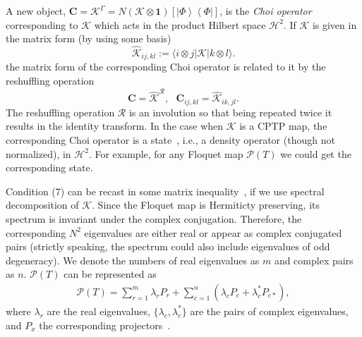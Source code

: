 \documentclass[%
 aip,
 floatfix,
 amsmath,amssymb,
 reprint,%
]{revtex4-1}
\newcommand{\id}{\mathbf{1}}
\newcommand{\ket}[1]{{\left|  #1 \right\rangle}}
\newcommand{\bra}[1]{{\left\langle  #1 \right|}}
\begin{document}
A new object, $\mathbf{C} = \mathcal{K}^\Gamma = N (\mathcal{K} \otimes \id)[\ket{\Phi}\bra{\Phi}]$, is the \emph{Choi operator}~\cite{choi} corresponding to $\mathcal{K}$ which acts in the product Hilbert space $\mathcal{H}^2$. If $\mathcal{K}$ is given in the matrix form (by using some basis)
\begin{equation}\label{super2}
   \widehat{\mathcal{K}}_{ij,kl} := \langle i \otimes j|  \mathcal{K} | k \otimes l\rangle .
\end{equation}
the matrix form of the corresponding Choi operator is related to it by the reshuffling operation~\cite{duala}
\begin{equation}\label{resh}
\mathbf{C} = \widehat{\mathcal{K}}^\mathcal{R},~~~ \mathbf{C}_{ij,kl}  = 
   \widehat{\mathcal{K}}_{ik,jl}.
\end{equation}
The reshuffling operation $\mathcal{R}$ is an involution so that being repeated twice it results in the identity transform. In the case when $\mathcal{K}$
is a CPTP map, the corresponding Choi operator is a state~\cite{choi,duala}, i.e., a density operator (though not normalized), in $\mathcal{H}^2$. For example, for any Floquet map $\mathcal{P}(T)$ we could get the corresponding state.

Condition (7) can be recast in some matrix inequality~\cite{X1}, if we use spectral decomposition of $\mathcal{K}$. Since the Floquet map is Hermiticty preserving, 
its spectrum is invariant under the complex  
conjugation. Therefore, the corresponding  $N^2$ eigenvalues are either real or appear as complex conjugated pairs (strictly speaking, the spectrum could also include eigenvalues of odd degeneracy). We denote 
the numbers of real eigenvalues as $m$ and complex pairs as $n$. %
$\mathcal{P}(T)$ can be represented as
\begin{align}
\mathcal{P}(T) =  \sum_{r=1}^{m} \lambda_r P_r +  \sum_{c=1}^{n}  \left(\lambda_c P_c +  \lambda_c^* P_{c*}\right),
\label{eq:map-jordan-form}
\end{align}
where $\lambda_r$ are the real eigenvalues, $\lbrace \lambda_c, \lambda_c^*\rbrace$ are the pairs of complex eigenvalues, and $P_x$ the corresponding  projectors~\cite{X1}.
\end{document}
